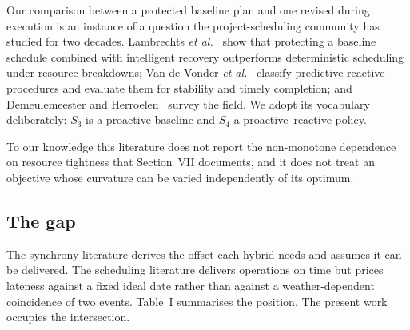 \documentclass[10pt,twocolumn]{article}
\begin{document}
Our comparison between a protected baseline plan and one revised during
execution is an instance of a question the project-scheduling community has
studied for two decades. Lambrechts \textit{et al.}~\cite{lambrechts2007}
show that protecting a baseline schedule combined with intelligent recovery
outperforms deterministic scheduling under resource breakdowns; Van de Vonder
\textit{et al.}~\cite{vandevonder2007} classify predictive-reactive
procedures and evaluate them for stability and timely completion; and
Demeulemeester and Herroelen~\cite{demeulemeester2009} survey the field. We
adopt its vocabulary deliberately: $S_3$ is a proactive baseline and $S_4$ a
proactive--reactive policy.

To our knowledge this literature does not report the non-monotone dependence
on resource tightness that Section~VII documents, and it does not treat an
objective whose curvature can be varied independently of its optimum.

\subsection{The gap}

The synchrony literature derives the offset each hybrid needs and assumes it
can be delivered. The scheduling literature delivers operations on time but
prices lateness against a fixed ideal date rather than against a
weather-dependent coincidence of two events. Table~I summarises the position.
The present work occupies the intersection.
\end{document}
